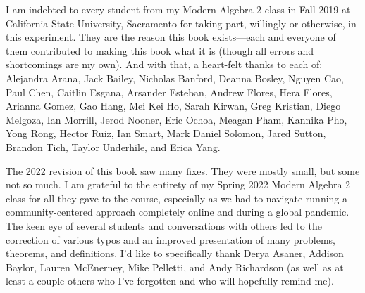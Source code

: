 \documentclass[12pt,oneside]{book}
\theoremstyle{definition}
\begin{document}
\medskip

\noindent I am  indebted to every student from my Modern Algebra 2 class in Fall 2019 at California State University, Sacramento for taking part, willingly or otherwise, in this experiment. They are the reason this book exists---each and everyone of them contributed to making this book what it is (though all errors and shortcomings are my own). And with that, a heart-felt thanks to each of: Alejandra Arana, Jack Bailey, Nicholas Banford, Deanna Bosley, Nguyen Cao, Paul Chen, Caitlin Esgana, Arsander Esteban, Andrew Flores, Hera Flores, Arianna Gomez, Gao Hang, Mei Kei Ho, Sarah Kirwan, Greg Kristian, Diego Melgoza, Ian Morrill, Jerod Nooner, Eric Ochoa, Meagan Pham, Kannika Pho, Yong Rong, Hector Ruiz, Ian Smart, Mark Daniel Solomon, Jared Sutton, Brandon Tich, Taylor Underhile, and Erica Yang. 

\medskip

\noindent The 2022 revision of this book saw many fixes. They were mostly small, but some not so much. I am grateful to the entirety of my Spring 2022 Modern Algebra 2 class for all they gave to the course, especially as we had to navigate running a community-centered approach completely online and during a global pandemic. The keen eye of several students and conversations with others led to the correction of various typos and an improved presentation of many problems, theorems, and definitions. I'd like to specifically thank Derya Asaner, Addison Baylor, Lauren McEnerney, Mike Pelletti, and Andy Richardson (as well as at least a couple others who I've forgotten and who will hopefully remind me).



\tableofcontents









\appendix

\end{document}

